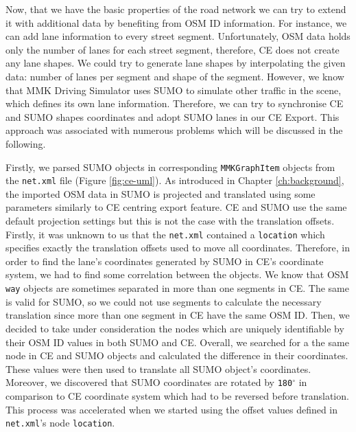 Now, that we have the basic properties of the road network we can try to extend it with additional data by benefiting from OSM ID information. For instance, we can add lane information to every street segment. Unfortunately, OSM data holds only the number of lanes for each street segment, therefore, CE does not create any lane shapes. We could try to generate lane shapes by interpolating the given data: number of lanes per segment and shape of the segment. However, we know that MMK Driving Simulator uses SUMO to simulate other traffic in the scene, which defines its own lane information. Therefore, we can try to synchronise CE and SUMO shapes coordinates and adopt SUMO lanes in our CE Export. This approach was associated with numerous problems which will be discussed in the following.

Firstly, we parsed SUMO objects in corresponding \texttt{MMKGraphItem} objects from the \texttt{net.xml} file (Figure \ref{fig:ce-uml}). As introduced in Chapter \ref{ch:background}, the imported OSM data in SUMO is projected and translated using some parameters similarly to CE centring export feature. CE and SUMO use the same default projection settings but this is not the case with the translation offsets. Firstly, it was unknown to us that the \texttt{net.xml} contained a \texttt{location} which specifies exactly the translation offsets used to move all coordinates. Therefore, in order to find the lane's coordinates generated by SUMO in CE's coordinate system, we had to find some correlation between the objects. We know that OSM \texttt{way} objects are sometimes separated in more than one segments in CE. The same is valid for SUMO, so we could not use segments to calculate the necessary translation since more than one segment in CE have the same OSM ID. Then, we decided to take under consideration the nodes which are uniquely identifiable by their OSM ID values in both SUMO and CE. Overall, we searched for a the same node in CE and SUMO objects and calculated the difference in their coordinates. These values were then used to translate all SUMO object's coordinates. Moreover, we discovered that SUMO coordinates are rotated by \texttt{180$^{\circ}$} in comparison to CE coordinate system which had to be reversed before translation. This process was accelerated when we started using the offset values defined in \texttt{net.xml}'s node \texttt{location}.\\ 

